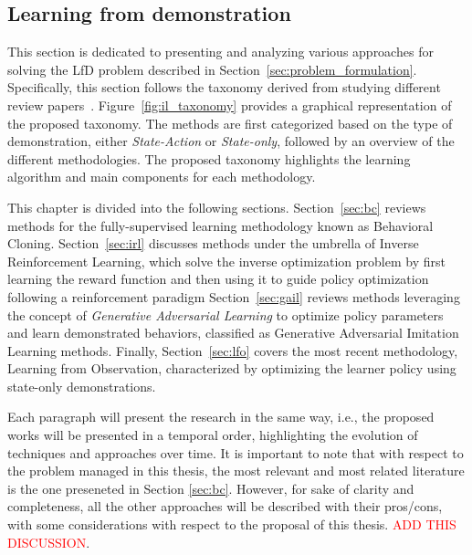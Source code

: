 \subsection{Learning from demonstration}
\label{sec:lfd}
This section is dedicated to presenting and analyzing various approaches for solving the LfD problem described in Section~\ref{sec:problem_formulation}. Specifically, this section follows the taxonomy derived from studying different review papers~\cite{kaelbling1996reinforcement_survey,argall2009robot_learning_from_demonstration,hussein2017imitation_learning_survey,fang2019survey,zheng2021imitation_progress_taxonomies_opportunities,zare2024survey}. Figure~\ref{fig:il_taxonomy} provides a graphical representation of the proposed taxonomy. The methods are first categorized based on the type of demonstration, either \textit{State-Action} or \textit{State-only}, followed by an overview of the different methodologies. The proposed taxonomy highlights the learning algorithm and main components for each methodology.

This chapter is divided into the following sections. Section~\ref{sec:bc} reviews methods for the fully-supervised learning methodology known as Behavioral Cloning. 
\newline Section~\ref{sec:irl} discusses methods under the umbrella of Inverse Reinforcement Learning, which solve the inverse optimization problem by first learning the reward function and then using it to guide policy optimization following a reinforcement paradigm
\newline Section~\ref{sec:gail} reviews methods leveraging the concept of \textit{Generative Adversarial Learning} to optimize policy parameters and learn demonstrated behaviors, classified as Generative Adversarial Imitation Learning methods.
\newline Finally, Section~\ref{sec:lfo} covers the most recent methodology, Learning from Observation, characterized by optimizing the learner policy using state-only demonstrations.

Each paragraph will present the research in the same way, i.e., the proposed works will be presented in a temporal order, highlighting the evolution of techniques and approaches over time.
It is important to note that with respect to the problem managed in this thesis, the most relevant and most related literature is the one preseneted in Section \ref{sec:bc}. However, for sake of clarity and completeness, all the other approaches will be described with their pros/cons, with some considerations with respect to the proposal of this thesis. \textcolor{red}{ADD THIS DISCUSSION}.










